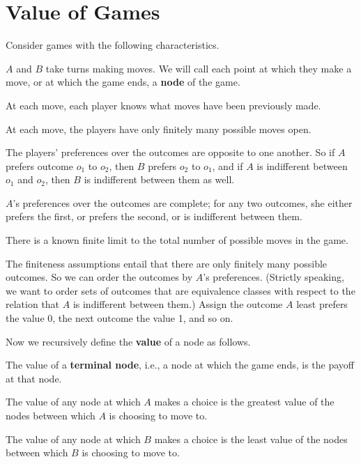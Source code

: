 \section{Value of Games}

Consider games with the following characteristics.

\begin{itemize*}
\item $A$ and $B$ take turns making moves. We will call each point at which they make a move, or at which the game ends, a \textbf{node} of the game.
\item At each move, each player knows what moves have been previously made.
\item At each move, the players have only finitely many possible moves open.
\item The players' preferences over the outcomes are opposite to one another. So if $A$ prefers outcome $o_1$ to $o_2$, then $B$ prefers $o_2$ to $o_1$, and if $A$ is indifferent between $o_1$ and $o_2$, then $B$ is indifferent between them as well.
\item $A$'s preferences over the outcomes are complete; for any two outcomes, she either prefers the first, or prefers the second, or is indifferent between them.
\item There is a known finite limit to the total number of possible moves in the game.
\end{itemize*}

\noindent The finiteness assumptions entail that there are only finitely many possible outcomes. So we can order the outcomes by $A$'s preferences. (Strictly speaking, we want to order sets of outcomes that are equivalence classes with respect to the relation that $A$ is indifferent between them.) Assign the outcome $A$ least prefers the value 0, the next outcome the value 1, and so on.

Now we recursively define the \textbf{value} of a node as follows.

\begin{itemize*}
\item The value of a \textbf{terminal node}, i.e., a node at which the game ends, is the payoff at that node.
\item The value of any node at which $A$ makes a choice is the greatest value of the nodes between which $A$ is choosing to move to.
\item The value of any node at which $B$ makes a choice is the least value of the nodes between which $B$ is choosing to move to.
\end{itemize*}

